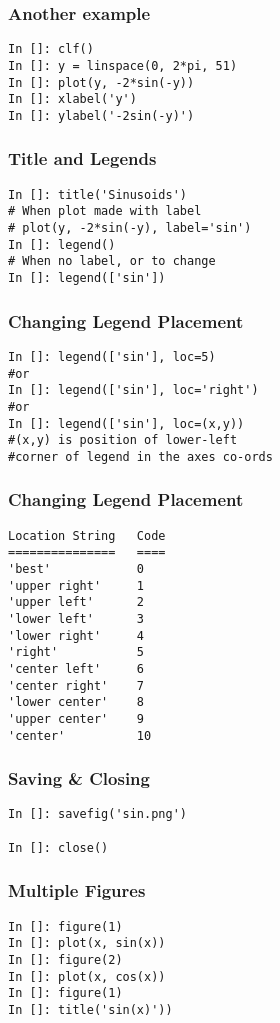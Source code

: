 \documentclass[14pt,compress]{beamer}
\begin{document}
\begin{frame}[fragile]
\frametitle{Another example}
  \begin{lstlisting}
In []: clf()
In []: y = linspace(0, 2*pi, 51)
In []: plot(y, -2*sin(-y))
In []: xlabel('y')
In []: ylabel('-2sin(-y)')
  \end{lstlisting}
\end{frame}

\begin{frame}[fragile]
\frametitle{Title and Legends}
\begin{lstlisting}
In []: title('Sinusoids')
# When plot made with label
# plot(y, -2*sin(-y), label='sin')
In []: legend() 
# When no label, or to change
In []: legend(['sin'])
\end{lstlisting}
\end{frame}

\begin{frame}[fragile]
\frametitle{Changing Legend Placement}
\begin{lstlisting}
In []: legend(['sin'], loc=5) 
#or 
In []: legend(['sin'], loc='right') 
#or
In []: legend(['sin'], loc=(x,y)) 
#(x,y) is position of lower-left 
#corner of legend in the axes co-ords
\end{lstlisting}
\end{frame}

\begin{frame}[fragile]
\frametitle{Changing Legend Placement}
\vspace{-0.15in}
\begin{lstlisting}
Location String   Code
===============   ====
'best'            0
'upper right'     1
'upper left'      2
'lower left'      3
'lower right'     4
'right'           5
'center left'     6
'center right'    7
'lower center'    8
'upper center'    9
'center'          10
\end{lstlisting}
\end{frame}


\begin{frame}[fragile]
\frametitle{Saving \& Closing}
\begin{lstlisting}
In []: savefig('sin.png')

In []: close()
\end{lstlisting}
\end{frame}

\begin{frame}[fragile]
\frametitle{Multiple Figures}
\begin{lstlisting}
In []: figure(1)
In []: plot(x, sin(x))
In []: figure(2)
In []: plot(x, cos(x))
In []: figure(1)
In []: title('sin(x)'))
\end{lstlisting}
\end{frame}
\end{document}
